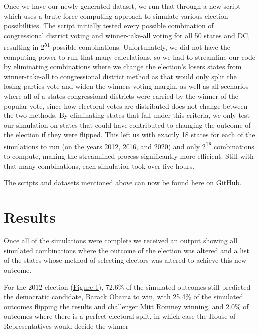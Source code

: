 \documentclass{article}
\begin{document}
Once we have our newly generated dataset, we run that through a new script which uses a brute force computing approach to simulate various election possibilities. The script initially tested every possible combination of congressional district voting and winner-take-all voting for all 50 states and DC, resulting in 2\textsuperscript{51} possible combinations. Unfortunately, we did not have the computing power to run that many calculations, so we had to streamline our code by eliminating combinations where we change the election’s losers states from winner-take-all  to congressional district method as that would only split the losing parties vote and widen the winners voting margin, as well as all scenarios where all of a states congressional districts were carried by the winner of the popular vote, since how electoral votes are distributed does not change between the two methods. By eliminating states that fall under this criteria, we only test our simulation on states that could have contributed to changing the outcome of the election if they were flipped. This left us with exactly 18 states for each of the simulations to run (on the years 2012, 2016, and 2020) and only 2\textsuperscript{18} combinations to compute, making the streamlined process significantly more efficient. Still with that many combinations, each simulation took over five hours.

The scripts and datasets mentioned above can now be found \href{https://github.com/edurso/gov-action-project}{here on GitHub}.

\section{Results}
Once all of the simulations were complete we received an output showing all simulated combinations where the outcome of the election was altered and a list of the states whose method of selecting electors was altered to achieve this new outcome.

For the 2012 election (\hyperref[fig:2012]{Figure 1}), 72.6\% of the simulated outcomes still predicted the democratic candidate, Barack Obama to win, with 25.4\% of the simulated outcomes flipping the results and challenger Mitt Romney winning, and 2.0\% of outcomes where there is a perfect electoral split, in which case the House of Representatives would decide the winner.
\end{document}
